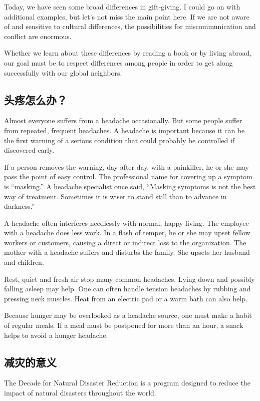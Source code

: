Today, we have seen some broad differences in gift-giving.
I could go on with additional examples, but let's not
miss the main point here. If we are not aware of and
sensitive to cultural differences, the possibilities for miscommunication
and conflict are enormous.

Whether we learn about these differences by reading a
book or by living abroad, our goal must be to respect differences
among people in order to get along successfully
with our global neighbors.

\subsection{头疼怎么办？}
Almost everyone suffers from a headache occasionally.
But some people suffer from repeated, frequent headaches.
A headache is important because it can be
the first warning of a serious condition that could probably
be controlled if discovered early.

If a person removes the warning, day after day, with a
painkiller, he or she may pass the point of easy control.
The professional name for covering up a symptom is
“masking.” A headache specialist once said, “Masking
symptoms is not the best way of treatment. Sometimes
it is wiser to stand still than to advance in darkness.”

A headache often interferes needlessly with normal,
happy living. The employee with a headache does less
work. In a flash of temper, he or she may upset fellow
workers or customers, causing a direct or indirect loss to
the organization. The mother with a headache suffers and
disturbs the family. She upsets her husband and children.

Rest, quiet and fresh air stop many common headaches.
Lying down and possibly falling asleep may help.
One can often handle tension headaches by rubbing and
pressing neck muscles. Heat from an electric pad or a
warm bath can also help.

Because hunger may be overlooked as a headache
source, one must make a habit of regular meals. If a meal
must be postponed for more than an hour, a snack helps
to avoid a hunger headache.



\subsection{减灾的意义}
The Decade for Natural Disaster Reduction is a program
designed to reduce the impact of natural disasters
throughout the world.

